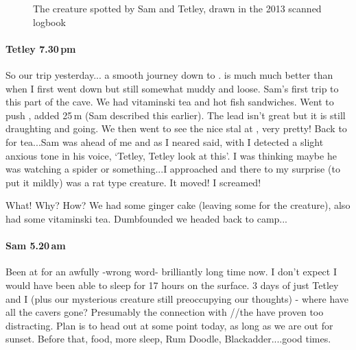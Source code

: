 \begin{figure}[t!]
	\checkoddpage \ifoddpage \forcerectofloat \else \forceversofloat \fi
	\centering
	\caption{The creature spotted by Sam and Tetley, drawn in the 2013 scanned logbook  }
	\label{the_creature}
\end{figure}


\paragraph{Tetley 7.30\,pm}

So our trip yesterday... a smooth journey down to .  is much much better than when I first went down but still somewhat muddy and loose. Sam's first trip to this part of the cave. We had vitaminski tea and hot fish sandwiches. Went to push , added 25\,m (Sam described this earlier). The lead isn't great but it is still draughting and going. We then went to see the nice stal at , very pretty! Back to  for tea...Sam was ahead of me and as I neared  said, with I detected a slight anxious tone in his voice, `Tetley, Tetley look at this'. I was thinking maybe he was watching a spider or something...I approached and there to my surprise (to put it mildly) was a rat type creature. It moved! I screamed!

What! Why? How? We had some ginger cake (leaving some for the creature), also had some vitaminski tea. Dumbfounded we headed back to camp...

\paragraph{Sam 5.20\,am}
Been at  for an awfully -wrong word- brilliantly long time now. I don't expect I would have been able to sleep for 17 hours on the surface. 3 days of just Tetley and I (plus our mysterious creature still preoccupying our thoughts) - where have all the cavers gone? Presumably the connection with //the  have proven too distracting. Plan is to head out at some point today, as long as we are out for sunset. Before that, food, more sleep, Rum Doodle, Blackadder....good times.

